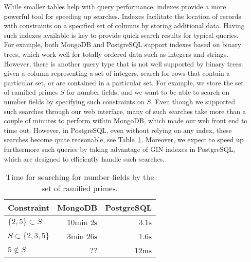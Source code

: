\documentclass{article}
\begin{document}
While smaller tables help with query performance, indexes provide a more powerful tool for speeding up searches.
Indexes facilitate the location of records with constraints on a specified set of columns by storing additional data.
Having such indexes available is key to provide quick search results for typical queries.
For example, both MongoDB and PostgreSQL support indexes based on binary trees, which work well for totally ordered data such as integers and strings.
However, there is another query type that is not well supported by binary trees: given a column representing a set of integers, search for rows that contain a particular set, or are contained in a particular set.
For example, we store the set of ramified primes $S$ for number fields, and we want to be able to search on number fields by specifying such constraints on $S$.
Even though we supported such searches through our web interface, many of such searches take more than a couple of minutes to perform within MongoDB, which made our web front end to time out.
However, in  PostgreSQL, even without relying on any index, these searches become quite reasonable, see Table~\ref{table:ramps}.
Moreover, we expect to speed up furthermore such queries by taking advantage of GIN indexes in PostgreSQL, which are designed to efficiently handle such searches.
\begin{table}[h!]
  \begin{center}
  \begin{tabular}{l|r|r}
Constraint & MongoDB & PostgreSQL\\
\hline
$\{2, 5\} \subset S$ & 10min 2s & 3.1s\\
$S \subset \{2, 3, 5\}$ & 3min 26s & 1.6s\\
$5 \notin S$ & ?? & 12ms
\end{tabular}
\caption{Time for searching for number fields by the set of ramified primes.}
\label{table:ramps}
\end{center}
\end{table}
\end{document}
